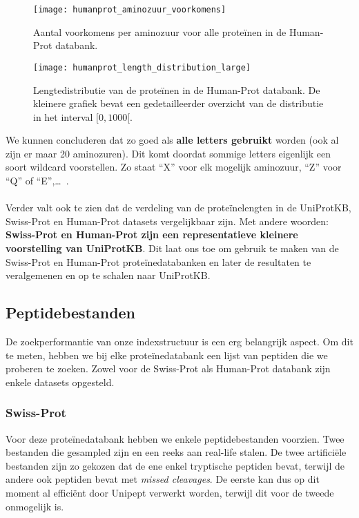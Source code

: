 \begin{figure}[ht]
    \centering
    \texttt{[image: humanprot\_aminozuur\_voorkomens]}
    \caption{Aantal voorkomens per aminozuur voor alle proteïnen in de Human-Prot databank.}
    \label{fig:humanprot_aminozuur}
\end{figure}

\begin{figure}[ht]
    \centering
    \texttt{[image: humanprot\_length\_distribution\_large]}
    \caption{Lengtedistributie van de proteïnen in de Human-Prot databank. De kleinere grafiek bevat een gedetailleerder overzicht van de distributie in het interval $[0, 1000[$.}\label{fig:humanprot_length}
\end{figure}

We kunnen concluderen dat zo goed als \textbf{alle letters gebruikt} worden (ook al zijn er maar 20 aminozuren).
Dit komt doordat sommige letters eigenlijk een soort wildcard voorstellen.
Zo staat ``X'' voor elk mogelijk aminozuur, ``Z'' voor ``Q'' of ``E'',\ldots~\cite{amino_acid_codes}.
\\ \\
Verder valt ook te zien dat de verdeling van de proteïnelengten in de UniProtKB, Swiss-Prot en Human-Prot datasets vergelijkbaar zijn.
Met andere woorden: \textbf{Swiss-Prot en Human-Prot zijn een representatieve kleinere voorstelling van UniProtKB\@}.
Dit laat ons toe om gebruik te maken van de Swiss-Prot en Human-Prot proteïnedatabanken en later de resultaten te veralgemenen en op te schalen naar UniProtKB\@.

\subsection{Peptidebestanden}\label{subsec:peptide-zoek-bestanden}
De zoekperformantie van onze indexstructuur is een erg belangrijk aspect.
Om dit te meten, hebben we bij elke proteïnedatabank een lijst van peptiden die we proberen te zoeken.
Zowel voor de Swiss-Prot als Human-Prot databank zijn enkele datasets opgesteld.

\subsubsection{Swiss-Prot}
Voor deze proteïnedatabank hebben we enkele peptidebestanden voorzien.
Twee bestanden die gesampled zijn en een reeks aan real-life stalen.
De twee artificiële bestanden zijn zo gekozen dat de ene enkel tryptische peptiden bevat, terwijl de andere ook peptiden bevat met \textit{missed cleavages}.
De eerste kan dus op dit moment al efficiënt door Unipept verwerkt worden, terwijl dit voor de tweede onmogelijk is.


